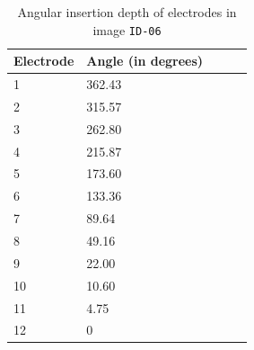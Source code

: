 \documentclass[a4paper, 10pt, twocolumn]{article}
\begin{document}
\begin{table}[]
\caption{Angular insertion depth of electrodes in image \texttt{ID-06}}
    \label{table}
    \begin{center}
\begin{tabular}{lllll}

\textbf{Electrode} & \textbf{Angle (in degrees)}\\
      \hline
1  & 362.43 &  &  &  \\
2  & 315.57 &  &  &  \\
3  & 262.80 &  &  &  \\
4  & 215.87 &  &  &  \\
5  & 173.60 &  &  &  \\
6  & 133.36 &  &  &  \\
7  & 89.64  &  &  &  \\
8  & 49.16  &  &  &  \\
9  & 22.00  &  &  &  \\
10 & 10.60  &  &  &  \\
11 & 4.75   &  &  &  \\
12 & 0      &  &  & 
\end{tabular}
\end{center}
\end{table}
\end{document}
